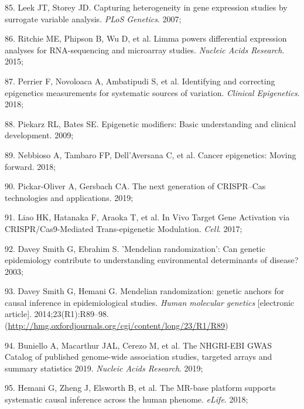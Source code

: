 \documentclass[11pt,oneside]{bristolthesis}
\newenvironment{cslreferences}%
  {}%
  {\par}
\begin{document}
\begin{cslreferences}
\leavevmode\hypertarget{ref-Leek2007}{}%
85. Leek JT, Storey JD. Capturing heterogeneity in gene expression studies by surrogate variable analysis. \emph{PLoS Genetics}. 2007;

\leavevmode\hypertarget{ref-Ritchie2015}{}%
86. Ritchie ME, Phipson B, Wu D, et al. Limma powers differential expression analyses for RNA-sequencing and microarray studies. \emph{Nucleic Acids Research}. 2015;

\leavevmode\hypertarget{ref-Perrier2018}{}%
87. Perrier F, Novoloaca A, Ambatipudi S, et al. Identifying and correcting epigenetics measurements for systematic sources of variation. \emph{Clinical Epigenetics}. 2018;

\leavevmode\hypertarget{ref-Piekarz2009}{}%
88. Piekarz RL, Bates SE. Epigenetic modifiers: Basic understanding and clinical development. 2009;

\leavevmode\hypertarget{ref-Nebbioso2018}{}%
89. Nebbioso A, Tambaro FP, Dell'Aversana C, et al. Cancer epigenetics: Moving forward. 2018;

\leavevmode\hypertarget{ref-Pickar-Oliver2019}{}%
90. Pickar-Oliver A, Gersbach CA. The next generation of CRISPR--Cas technologies and applications. 2019;

\leavevmode\hypertarget{ref-Liao2017}{}%
91. Liao HK, Hatanaka F, Araoka T, et al. In Vivo Target Gene Activation via CRISPR/Cas9-Mediated Trans-epigenetic Modulation. \emph{Cell}. 2017;

\leavevmode\hypertarget{ref-DaveySmith2003}{}%
92. Davey Smith G, Ebrahim S. 'Mendelian randomization': Can genetic epidemiology contribute to understanding environmental determinants of disease? 2003;

\leavevmode\hypertarget{ref-DaveySmith2014}{}%
93. Davey Smith G, Hemani G. Mendelian randomization: genetic anchors for causal inference in epidemiological studies. \emph{Human molecular genetics} {[}electronic article{]}. 2014;23(R1):R89--98. (\url{http://hmg.oxfordjournals.org/cgi/content/long/23/R1/R89})

\leavevmode\hypertarget{ref-Buniello2019}{}%
94. Buniello A, Macarthur JAL, Cerezo M, et al. The NHGRI-EBI GWAS Catalog of published genome-wide association studies, targeted arrays and summary statistics 2019. \emph{Nucleic Acids Research}. 2019;

\leavevmode\hypertarget{ref-Hemani2018}{}%
95. Hemani G, Zheng J, Elsworth B, et al. The MR-base platform supports systematic causal inference across the human phenome. \emph{eLife}. 2018;


\end{cslreferences}
\end{document}
